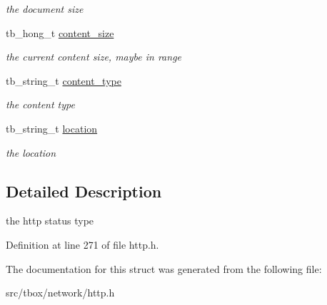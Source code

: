 \begin{DoxyCompactItemize}
\begin{DoxyCompactList}\small\item\em the document size \end{DoxyCompactList}\item 
\hypertarget{structtb__http__status__t_a0ab92559e5c25f41c333c6f43c0e2837}{tb\-\_\-hong\-\_\-t \hyperlink{structtb__http__status__t_a0ab92559e5c25f41c333c6f43c0e2837}{content\-\_\-size}}\label{structtb__http__status__t_a0ab92559e5c25f41c333c6f43c0e2837}

\begin{DoxyCompactList}\small\item\em the current content size, maybe in range \end{DoxyCompactList}\item 
\hypertarget{structtb__http__status__t_ad9e4a28d2324179cec88ff57dd420593}{tb\-\_\-string\-\_\-t \hyperlink{structtb__http__status__t_ad9e4a28d2324179cec88ff57dd420593}{content\-\_\-type}}\label{structtb__http__status__t_ad9e4a28d2324179cec88ff57dd420593}

\begin{DoxyCompactList}\small\item\em the content type \end{DoxyCompactList}\item 
\hypertarget{structtb__http__status__t_a9ae27de8713469d36f454c2ad0258071}{tb\-\_\-string\-\_\-t \hyperlink{structtb__http__status__t_a9ae27de8713469d36f454c2ad0258071}{location}}\label{structtb__http__status__t_a9ae27de8713469d36f454c2ad0258071}

\begin{DoxyCompactList}\small\item\em the location \end{DoxyCompactList}\end{DoxyCompactItemize}


\subsection{Detailed Description}
the http status type 

Definition at line 271 of file http.\-h.



The documentation for this struct was generated from the following file\-:\begin{DoxyCompactItemize}
\item 
src/tbox/network/http.\-h\end{DoxyCompactItemize}
